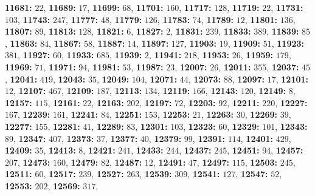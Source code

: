 \textsf{\bfseries 11681:} $22$, \textsf{\bfseries 11689:} $17$, \textsf{\bfseries 11699:} $68$, \textsf{\bfseries 11701:} $160$, \textsf{\bfseries 11717:} $128$, \textsf{\bfseries 11719:} $22$, \textsf{\bfseries 11731:} $103$, \textsf{\bfseries 11743:} $247$, \textsf{\bfseries 11777:} $48$, \textsf{\bfseries 11779:} $126$, \textsf{\bfseries 11783:} $74$, \textsf{\bfseries 11789:} $12$, \textsf{\bfseries 11801:} $136$, \textsf{\bfseries 11807:} $89$, \textsf{\bfseries 11813:} $128$, \textsf{\bfseries 11821:} $6$, \textsf{\bfseries 11827:} $2$, \textsf{\bfseries 11831:} $239$, \textsf{\bfseries 11833:} $389$, \textsf{\bfseries 11839:} $85$, \textsf{\bfseries 11863:} $84$, \textsf{\bfseries 11867:} $58$, \textsf{\bfseries 11887:} $14$, \textsf{\bfseries 11897:} $127$, \textsf{\bfseries 11903:} $19$, \textsf{\bfseries 11909:} $51$, \textsf{\bfseries 11923:} $381$, \textsf{\bfseries 11927:} $60$, \textsf{\bfseries 11933:} $685$, \textsf{\bfseries 11939:} $2$, \textsf{\bfseries 11941:} $218$, \textsf{\bfseries 11953:} $26$, \textsf{\bfseries 11959:} $179$, \textsf{\bfseries 11969:} $71$, \textsf{\bfseries 11971:} $94$, \textsf{\bfseries 11981:} $53$, \textsf{\bfseries 11987:} $23$, \textsf{\bfseries 12007:} $26$, \textsf{\bfseries 12011:} $355$, \textsf{\bfseries 12037:} $45$, \textsf{\bfseries 12041:} $419$, \textsf{\bfseries 12043:} $35$, \textsf{\bfseries 12049:} $104$, \textsf{\bfseries 12071:} $44$, \textsf{\bfseries 12073:} $88$, \textsf{\bfseries 12097:} $17$, \textsf{\bfseries 12101:} $12$, \textsf{\bfseries 12107:} $467$, \textsf{\bfseries 12109:} $187$, \textsf{\bfseries 12113:} $134$, \textsf{\bfseries 12119:} $166$, \textsf{\bfseries 12143:} $120$, \textsf{\bfseries 12149:} $8$, \textsf{\bfseries 12157:} $115$, \textsf{\bfseries 12161:} $22$, \textsf{\bfseries 12163:} $202$, \textsf{\bfseries 12197:} $72$, \textsf{\bfseries 12203:} $92$, \textsf{\bfseries 12211:} $220$, \textsf{\bfseries 12227:} $167$, \textsf{\bfseries 12239:} $161$, \textsf{\bfseries 12241:} $84$, \textsf{\bfseries 12251:} $153$, \textsf{\bfseries 12253:} $21$, \textsf{\bfseries 12263:} $30$, \textsf{\bfseries 12269:} $39$, \textsf{\bfseries 12277:} $155$, \textsf{\bfseries 12281:} $41$, \textsf{\bfseries 12289:} $83$, \textsf{\bfseries 12301:} $103$, \textsf{\bfseries 12323:} $60$, \textsf{\bfseries 12329:} $101$, \textsf{\bfseries 12343:} $89$, \textsf{\bfseries 12347:} $407$, \textsf{\bfseries 12373:} $37$, \textsf{\bfseries 12377:} $40$, \textsf{\bfseries 12379:} $99$, \textsf{\bfseries 12391:} $114$, \textsf{\bfseries 12401:} $429$, \textsf{\bfseries 12409:} $35$, \textsf{\bfseries 12413:} $8$, \textsf{\bfseries 12421:} $241$, \textsf{\bfseries 12433:} $244$, \textsf{\bfseries 12437:} $245$, \textsf{\bfseries 12451:} $94$, \textsf{\bfseries 12457:} $207$, \textsf{\bfseries 12473:} $160$, \textsf{\bfseries 12479:} $82$, \textsf{\bfseries 12487:} $12$, \textsf{\bfseries 12491:} $47$, \textsf{\bfseries 12497:} $115$, \textsf{\bfseries 12503:} $245$, \textsf{\bfseries 12511:} $60$, \textsf{\bfseries 12517:} $239$, \textsf{\bfseries 12527:} $263$, \textsf{\bfseries 12539:} $309$, \textsf{\bfseries 12541:} $127$, \textsf{\bfseries 12547:} $52$, \textsf{\bfseries 12553:} $202$, \textsf{\bfseries 12569:} $317$, 
